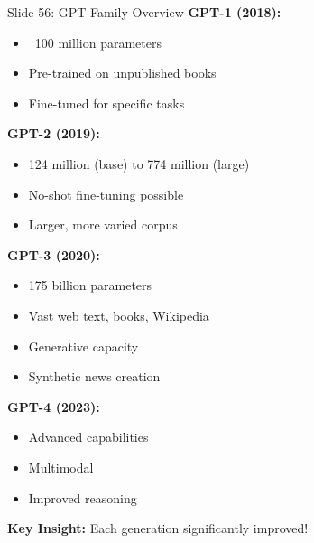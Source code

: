 \documentclass[8pt]{beamer}
\begin{document}
	\begin{frame}{Slide 56: GPT Family Overview}
		\fontsize{6.5}{7.5}\selectfont
		\textbf{GPT-1 (2018):}
		\begin{itemize}
			\item ~100 million parameters
			\item Pre-trained on unpublished books
			\item Fine-tuned for specific tasks		\end{itemize}
		
		\vspace{0.1cm}
		\textbf{GPT-2 (2019):}
		\begin{itemize}
			\item 124 million (base) to 774 million (large)
			\item No-shot fine-tuning possible
			\item Larger, more varied corpus
		\end{itemize}
		
		\vspace{0.1cm}
		\textbf{GPT-3 (2020):}
		\begin{itemize}
			\item 175 billion parameters
			\item Vast web text, books, Wikipedia
			\item Generative capacity
			\item Synthetic news creation
		\end{itemize}
		
		\vspace{0.1cm}
		\textbf{GPT-4 (2023):}
		\begin{itemize}
			\item Advanced capabilities
			\item Multimodal
			\item Improved reasoning
		\end{itemize}
		
		\textcolor{myblue}{\textbf{Key Insight:}} Each generation significantly improved!
	\end{frame}
	
\end{document}
